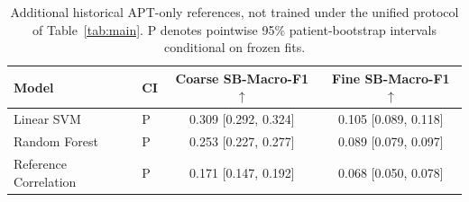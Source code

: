 \begin{table}[H]
\centering\small
\setlength{\tabcolsep}{6pt}
\begin{tabular}{llcc}
\toprule
Model & CI & Coarse SB-Macro-F1 $\uparrow$ & Fine SB-Macro-F1 $\uparrow$ \\
\midrule
Linear SVM & P & 0.309 [0.292, 0.324] & 0.105 [0.089, 0.118] \\
Random Forest & P & 0.253 [0.227, 0.277] & 0.089 [0.079, 0.097] \\
Reference Correlation & P & 0.171 [0.147, 0.192] & 0.068 [0.050, 0.078] \\
\bottomrule
\end{tabular}
\caption{Additional historical APT-only references, not trained under the unified protocol of Table~\ref{tab:main}.
P denotes pointwise 95\% patient-bootstrap intervals conditional on frozen fits.}
\label{tab:hierarchy_sb_all}
\end{table}
